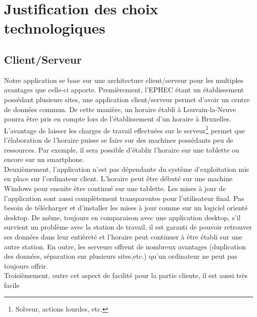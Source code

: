 
\chapter{Justification des choix technologiques}

\section{Client/Serveur}

Notre application se base sur une architecture client/serveur pour les multiples
avantages que celle-ci apporte.
\newline
\indent
Premièrement, l'EPHEC étant un établissement possédant plusieurs sites, une application client/serveur permet d'avoir un centre de données  commun.
 \newline
 \indent
 De cette manière, un horaire établi à Louvain-la-Neuve pourra être pris en
 compte lors de l'établissement d'un horaire à Bruxelles.
L'avantage de laisser les charges de travail effectuées sur le serveur\footnote{Solveur, actions lourdes, etc.} permet que l'élaboration de l'horaire puisse se
faire sur des machines possédants peu de ressources. Par exemple, il sera
possible d'établir l'horaire sur une tablette ou encore sur un smartphone.\\
\newline
\indent
Deuxièmement, l'application n'est pas dépendante du système
d'exploitation mis en place sur l'ordinateur client. L'horaire peut être débuté sur
une machine Windows pour ensuite être continué sur une tablette.
Les mises à jour de l'application sont aussi complètement transparentes pour
l'utilisateur final. Pas besoin de télécharger et d'installer les mises à jour
comme sur un logiciel orienté desktop.
\newline
\indent
De même, toujours en comparaison avec une application desktop, s'il survient un
problème avec la station de travail, il est garanti de pouvoir retrouver ses
données dans leur entièreté et l'horaire peut continuer à être établi
sur une autre station. En outre, les serveurs offrent de nombreux avantages (duplication des
données, séparation sur plusieurs sites,etc.) qu'un ordinateur ne peut pas toujours offrir.\\
\newline
\indent
Troisièmement, outre cet aspect de facilité pour la partie cliente, il est aussi très facile
